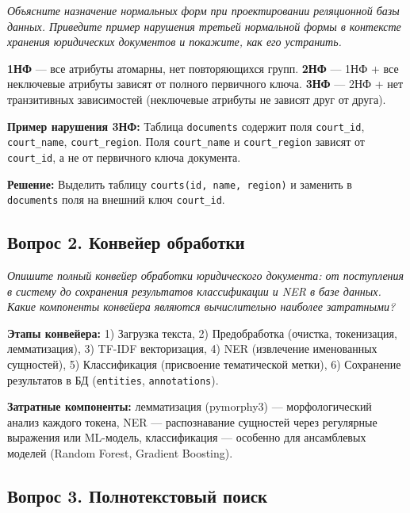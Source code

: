 \documentclass[a4paper,12pt]{article}
\begin{document}
\textit{Объясните назначение нормальных форм при проектировании реляционной базы данных. Приведите пример нарушения третьей нормальной формы в контексте хранения юридических документов и покажите, как его устранить.}

\begin{infobox}
\textbf{1НФ} — все атрибуты атомарны, нет повторяющихся групп. \textbf{2НФ} — 1НФ + все неключевые атрибуты зависят от полного первичного ключа. \textbf{3НФ} — 2НФ + нет транзитивных зависимостей (неключевые атрибуты не зависят друг от друга).

\textbf{Пример нарушения 3НФ:} Таблица \texttt{documents} содержит поля \texttt{court\_id}, \texttt{court\_name}, \texttt{court\_region}. Поля \texttt{court\_name} и \texttt{court\_region} зависят от \texttt{court\_id}, а не от первичного ключа документа.

\textbf{Решение:} Выделить таблицу \texttt{courts(id, name, region)} и заменить в \texttt{documents} поля на внешний ключ \texttt{court\_id}.
\end{infobox}

\subsection*{Вопрос 2. Конвейер обработки}

\textit{Опишите полный конвейер обработки юридического документа: от поступления в систему до сохранения результатов классификации и NER в базе данных. Какие компоненты конвейера являются вычислительно наиболее затратными?}

\begin{infobox}
\textbf{Этапы конвейера:} 1) Загрузка текста, 2) Предобработка (очистка, токенизация, лемматизация), 3) TF-IDF векторизация, 4) NER (извлечение именованных сущностей), 5) Классификация (присвоение тематической метки), 6) Сохранение результатов в БД (\texttt{entities}, \texttt{annotations}).

\textbf{Затратные компоненты:} лемматизация (pymorphy3) — морфологический анализ каждого токена, NER — распознавание сущностей через регулярные выражения или ML-модель, классификация — особенно для ансамблевых моделей (Random Forest, Gradient Boosting).
\end{infobox}

\subsection*{Вопрос 3. Полнотекстовый поиск}
\end{document}
